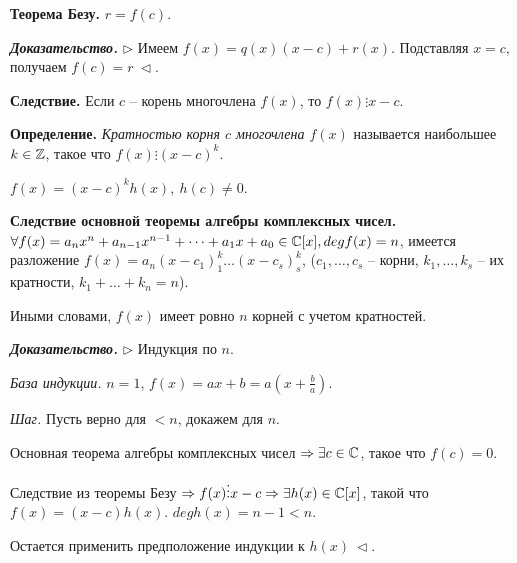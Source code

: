 \vspace{\baselineskip}
\textbf{Теорема Безу.} $r = f(c)$.

\vspace{\baselineskip}
\textbf{\textit{Доказательство.}} $\rhd$ Имеем $f(x) = q(x)(x - c) + r(x)$. Подставляя $x=c$, получаем $f(c) = r \ \lhd$.

\vspace{\baselineskip}
\textbf{Следствие.} Если $c$ -- корень многочлена $f(x)$, то $f(x) \vdots x - c$.

\vspace{\baselineskip}
\textbf{Определение.} \textit{Кратностью корня $c$ многочлена $f(x)$} называется наибольшее $k \in \mathbb{Z}$, такое что $f(x) \vdots (x - c)^k$.

$f(x) = (x - c)^k h(x), \ h(c) \neq 0$.

\vspace{\baselineskip}
\textbf{Следствие основной теоремы алгебры комплексных чисел.} $\forall f(x) = a_n x^n + a_{n-1} x^{n-1} + \dots + a_1 x + a_0 \in \mathbb{C}[x], deg f(x) = n$, имеется разложение $f(x) = a_n (x - c_1)^k_1
\dots (x - c_s)^k_s$, ($c_1, \dots, c_s$ -- корни, $k_1, \dots, k_s$ -- их кратности, $k_1 + \dots + k_n = n$).

\vspace{\baselineskip}
Иными словами, $f(x)$ имеет ровно $n$ корней с учетом кратностей.

\vspace{\baselineskip}
\textbf{\textit{Доказательство.}} $\rhd$ Индукция по $n$.

\textit{База индукции.} $n = 1$, $f(x) = ax + b = a (x + \frac{b}{a})$.

\textit{Шаг.} Пусть верно для $<n$, докажем для $n$.

Основная теорема алгебры комплексных чисел $\Rightarrow \exists c \in \mathbb{C}$, такое что $f(c) = 0$.

Следствие из теоремы Безу $\Rightarrow f(x) \vdots x - c \Rightarrow \exists h(x) \in \mathbb{C}[x]$, такой что $f(x) = (x-c)h(x)$. $degh(x) = n-1 < n$.

Остается применить предположение индукции к $h(x) \ \lhd$.


